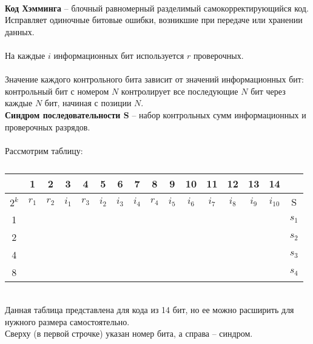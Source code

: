 \\\textbf{Код Хэмминга} -- блочный равномерный разделимый самокорректирующийся код. Исправляет одиночные битовые ошибки, возникшие при передаче или хранении данных.
\\
\\На каждые $i$ информационных бит используется $r$ проверочных.
\\
\\Значение каждого контрольного бита зависит от значений информационных бит: контрольный бит с номером $N$ контролирует все последующие $N$ бит через каждые $N$ бит, начиная с позиции $N$.
\\\textbf{Синдром последовательности S} -- набор контрольных сумм информационных и проверочных разрядов.
\\
\\Рассмотрим таблицу:
\begin{table}[h]
\caption{}
\begin{tabular}{|c|c|c|c|c|c|c|c|c|c|c|c|c|c|c|c|}
\hline
& 1 & 2 & 3 & 4 & 5 & 6 & 7 & 8 & 9 & 10 & 11 & 12 & 13 & 14 & \\
\hline
$2^k$ & $r_{1}$ & $r_{2}$ & $i_{1}$ & $r_{3}$ & $i_{2}$ & $i_{3}$ & $i_{4}$ & $r_{4}$ & $i_{5}$ & $i_{6}$ & $i_{7}$ & $i_{8}$ & $i_{9}$ & $i_{10}$ & S\\
\hline
1 & \cellcolor{Gray1}{X} & & \cellcolor{Gray1}{X} & & \cellcolor{Gray1}{X} & & \cellcolor{Gray1}{X} & & \cellcolor{Gray1}{X} & & \cellcolor{Gray1}{X} & & \cellcolor{Gray1}{X} & & $s_{1}$\\
\hline
2 & & \cellcolor{Gray2}{X} & \cellcolor{Gray2}{X} & & & \cellcolor{Gray2}{X} & \cellcolor{Gray2}{X} & & & \cellcolor{Gray2}{X} & \cellcolor{Gray2}{X} & & & \cellcolor{Gray2}{X} & $s_{2}$ \\
\hline
4 & & & & \cellcolor{Gray3}{X} & \cellcolor{Gray3}{X} & \cellcolor{Gray3}{X} & \cellcolor{Gray3}{X} & & & & & \cellcolor{Gray3}{X} & \cellcolor{Gray3}{X} & \cellcolor{Gray3}{X} & $s_{3}$ \\
\hline
8 & & & & & & & & \cellcolor{Gray4}{X} & \cellcolor{Gray4}{X} & \cellcolor{Gray4}{X} & \cellcolor{Gray4}{X} & \cellcolor{Gray4}{X} & \cellcolor{Gray4}{X} & \cellcolor{Gray4}{X} & $s_{4}$ \\
\hline
\end{tabular}
\end{table}
\\Данная таблица представлена для кода из 14 бит, но ее можно расширить для нужного размера самостоятельно.
\\Сверху (в первой строчке) указан номер бита, а справа -- синдром.
